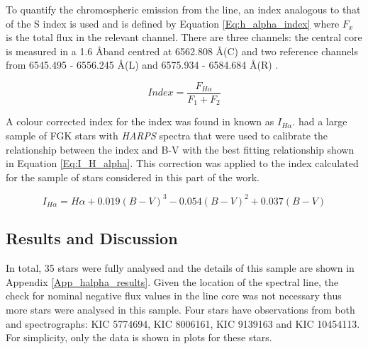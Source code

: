 To quantify the chromospheric emission from the \Halpha line, an index analogous to that of the S index is used and is defined by Equation \ref{Eq:h_alpha_index} where $F_{x}$ is the total flux in the relevant channel. There are three channels: the central \Halpha core is measured in a 1.6 \AA \space band centred at 6562.808 \AA \space (C) and two reference channels from 6545.495 - 6556.245 \AA \space (L) and 6575.934 - 6584.684 \AA \space (R) \citep{Gomes_da_Silva_etal_2011}.

\begin{equation}
    Index = \frac{F_{H{\alpha}}}{F_{1}+F_{2}}
    \label{Eq:h_alpha_index}
\end{equation}

A colour corrected index for the \Halpha index was found in \citet{Gomes_da_Silva_etal_2014} known as $I_{H\alpha}$. \citet{Gomes_da_Silva_etal_2014} had a large sample of FGK stars with \textit{HARPS} spectra that were used to calibrate the relationship between the \Halpha index and B-V with the best fitting relationship shown in Equation \ref{Eq:I_H_alpha}. This correction was applied to the \Halpha index calculated for the sample of stars considered in this part of the work.

\begin{equation}
    I_{H\alpha} = H\alpha + 0.019(B-V)^{3} - 0.054(B-V)^{2} + 0.037(B-V)
    \label{Eq:I_H_alpha}
\end{equation}

\subsection{Results and Discussion}
In total, 35 stars were fully analysed and the details of this sample are shown in Appendix \ref{App_halpha_results}. Given the location of the \Halpha spectral line, the check for nominal negative flux values in the line core was not necessary thus more stars were analysed in this sample. Four stars have observations from both \esp and \narval spectrographs: KIC 5774694, KIC 8006161, KIC 9139163 and KIC 10454113. For simplicity, only the \narval data is shown in plots for these stars.

